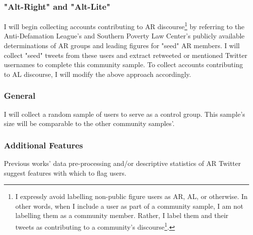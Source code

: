 \documentclass[acmlarge, screen, authorversion]{acmart}
\begin{document}
\subsubsection{"Alt-Right" and "Alt-Lite"}

I will begin collecting accounts contributing to AR discourse\footnote{I expressly
avoid labelling non-public figure users as AR, AL, or otherwise. In other words,
when I include a user as part of a community sample, I am not labelling them as
a community member. Rather, I label them and their tweets as contributing to a
community's discourse\footnote{In some ways, I follow
\citet{salazarAltRightCommunityDiscourse2018}'s suggestion to examine the
"alt-right" as a \textit{community of discourse}}. 	} by referring to the
Anti-Defamation League's \cite{anti-defamationleagueAltRightAlt} and Southern
Poverty Law Center's \cite{southernpovertylawcenterAltRight} publicly available
determinations of AR groups and leading figures for "seed" AR members. I will collect
"seed" tweets from these users and extract retweeted or mentioned Twitter
usernames to complete this community sample.
To collect accounts contributing to AL discourse, I will modify the above approach accordingly.

\subsubsection{General}

I will collect a random sample of users to serve as a control group. This sample's size will be comparable to the other community samples'.




\subsubsection{Additional Features}

Previous works' \cite{bergerAltrightTwitterCensus2018, alizadehPsychologyMoralityPolitical2019} data pre-processing and/or descriptive statistics of AR Twitter suggest features with which to flag users.
\end{document}

